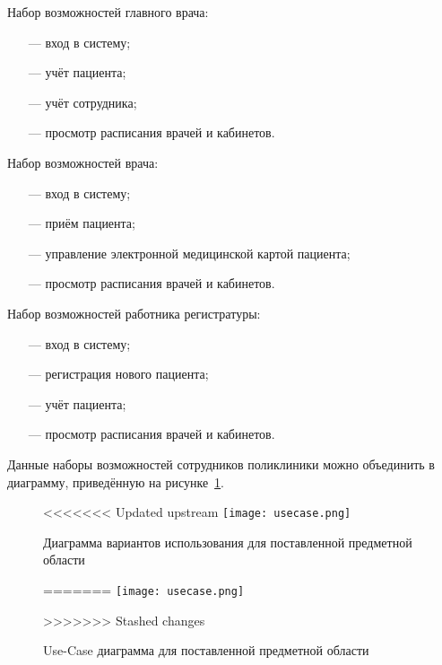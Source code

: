 Набор возможностей главного врача:
\begin{itemize}[leftmargin=1.6\parindent]
	\item[---] вход в систему;
	\item[---] учёт пациента;
	\item[---] учёт сотрудника;
	\item[---] просмотр расписания врачей и кабинетов.
\end{itemize}

Набор возможностей врача:
\begin{itemize}[leftmargin=1.6\parindent]
	\item[---] вход в систему;
	\item[---] приём пациента;
	\item[---] управление электронной медицинской картой пациента;
	\item[---] просмотр расписания врачей и кабинетов.
\end{itemize}

Набор возможностей работника регистратуры:
\begin{itemize}[leftmargin=1.6\parindent]
	\item[---] вход в систему;
	\item[---] регистрация нового пациента;
	\item[---] учёт пациента;
	\item[---] просмотр расписания врачей и кабинетов.
\end{itemize}

Данные наборы возможностей сотрудников поликлиники можно объединить в диаграмму, приведённую на рисунке~\ref{fig:usecase}.

\begin{figure}[h!]
	\centering
	\captionsetup{justification=centering}
<<<<<<< Updated upstream
	\texttt{[image: usecase.png]}
	\caption{Диаграмма вариантов использования для поставленной предметной области}
=======
	\texttt{[image: usecase.png]}
	\caption{Use-Case диаграмма для поставленной предметной области}
>>>>>>> Stashed changes
	\label{fig:usecase}
\end{figure}


%

